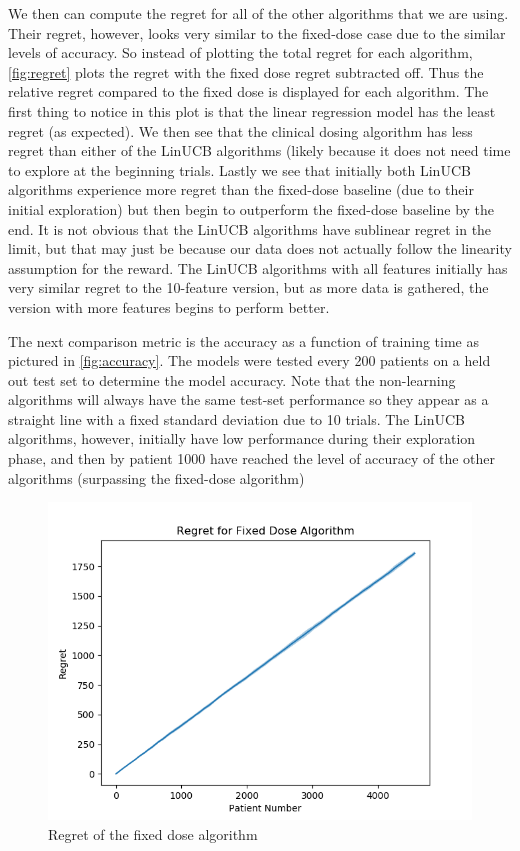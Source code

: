 \documentclass{article}
\begin{document}
We then can compute the regret for all of the other algorithms that we are using. Their regret, however, looks very similar to the fixed-dose case due to the similar levels of accuracy. So instead of plotting the total regret for each algorithm, \cref{fig:regret} plots the regret with the fixed dose regret subtracted off. Thus the relative regret compared to the fixed dose is displayed for each algorithm. The first thing to notice in this plot is that the linear regression model has the least regret (as expected). We then see that the clinical dosing algorithm has less regret than either of the LinUCB algorithms (likely because it does not need time to explore at the beginning trials. Lastly we see that initially both LinUCB algorithms experience more regret than the fixed-dose baseline (due to their initial exploration) but then begin to outperform the fixed-dose baseline by the end. It is not obvious that the LinUCB algorithms have sublinear regret in the limit, but that may just be because our data does not actually follow the linearity assumption for the reward. The LinUCB algorithms with all features initially has very similar regret to the 10-feature version, but as more data is gathered, the version with more features begins to perform better. 

The next comparison metric is the accuracy as a function of training time as pictured in \cref{fig:accuracy}. The models were tested every 200 patients on a held out test set to determine the model accuracy. Note that the non-learning algorithms will always have the same test-set performance so they appear as a straight line with a fixed standard deviation due to 10 trials. The LinUCB algorithms, however, initially have low performance during their exploration phase, and then by patient 1000 have reached the level of accuracy of the other algorithms (surpassing the fixed-dose algorithm)

\begin{figure}
    \centering
    \includegraphics[width=\columnwidth]{regret_fd}
    \caption{Regret of the fixed dose algorithm}
    \label{fig:regret_fd}
\end{figure}
\end{document}
